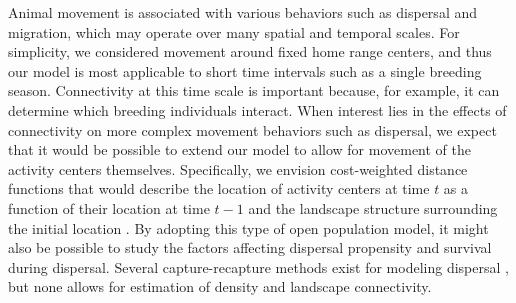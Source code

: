 \documentclass[12pt]{article}
\begin{document}
\begin{spacing}{1.8}

Animal movement is associated with various behaviors such as dispersal and
migration, which may operate over many spatial and temporal
scales. For simplicity, we considered movement around
fixed home range centers, and thus our model is most applicable to
short time intervals such as a single breeding season. %
Connectivity at this time scale is important because, for example,
it can determine which breeding individuals interact. When
interest lies in the effects of connectivity on more complex movement
behaviors such as dispersal, we expect that it
would be possible to extend our model to allow for movement of the
activity centers themselves. Specifically, we envision cost-weighted
distance functions that would describe the location of activity
centers at time $t$ as a function of their location at time $t-1$ and
the landscape structure surrounding the initial location
\citep{gardner_etal:2010ecol}. By adopting
this type of open population model, it might also be possible to study
the factors affecting dispersal propensity and survival during
dispersal. Several capture-recapture methods exist for modeling
dispersal
\citep{kendall_nichols:2004,fujiwara_etal:2006,ovaskainen_etal:2008},
but none
allows for estimation of density and landscape connectivity.



\end{spacing}
\end{document}
